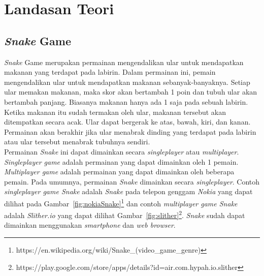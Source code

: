 \chapter{Landasan Teori}
\label{chap:teori}



\section{\textit{Snake} Game}
\label{sec:snake}
\textit{Snake} Game merupakan permainan mengendalikan ular untuk mendapatkan makanan yang terdapat pada labirin. Dalam permainan ini, pemain mengendalikan ular untuk mendapatkan makanan sebanyak-banyaknya. Setiap ular memakan makanan, maka skor akan bertambah 1 poin dan tubuh ular akan bertambah panjang. Biasanya makanan hanya ada 1 saja pada sebuah labirin. Ketika makanan itu sudah termakan oleh ular, makanan tersebut akan ditempatkan secara acak. Ular dapat bergerak ke atas, bawah, kiri, dan kanan. Permainan akan berakhir jika ular menabrak dinding yang terdapat pada labirin atau ular tersebut menabrak tubuhnya sendiri. \\

Permainan \textit{Snake} ini dapat dimainkan secara \textit{singleplayer} atau \textit{multiplayer}. \textit{Singleplayer game} adalah permainan yang dapat dimainkan oleh 1 pemain. \textit{Multiplayer game} adalah permainan yang dapat dimainkan oleh beberapa pemain. Pada umumnya, permainan \textit{Snake} dimainkan secara \textit{singleplayer}. Contoh \textit{singleplayer game Snake} adalah \textit{Snake} pada telepon genggam \textit{Nokia} yang dapat dilihat pada Gambar~\ref{fig:nokiaSnake}\footnote{https://en.wikipedia.org/wiki/Snake\_(video\_game\_genre)} dan contoh \textit{multiplayer game Snake} adalah \textit{Slither.io} yang dapat dilihat Gambar~\ref{fig:slither}\footnote{https://play.google.com/store/apps/details?id=air.com.hypah.io.slither}. \textit{Snake} sudah dapat dimainkan menggunakan \textit{smartphone} dan \textit{web browser}.  


